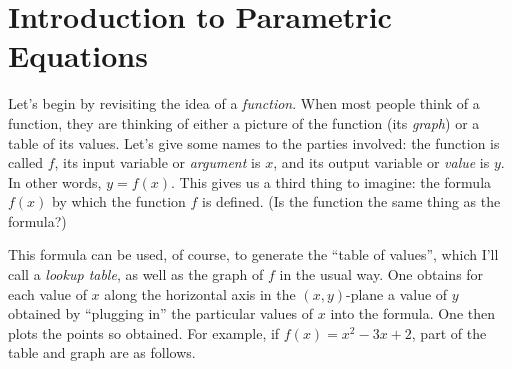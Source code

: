 \documentclass[11pt]{amsart}
\begin{document}
\section{Introduction to Parametric Equations}

Let's begin by revisiting the idea of a \emph{function}. When most people think of a function, they are thinking of either a picture of the function (its \emph{graph}) or a table of its values. Let's give some names to the parties involved: the function is called $f$, its input variable or \emph{argument} is $x$, and its output variable or \emph{value} is $y$. In other words, $y = f(x)$. This gives us a third thing to imagine: the formula $f(x)$ by which the function $f$ is defined. (Is the function the same thing as the formula?)

This formula can be used, of course, to generate the ``table of values'', which I'll call a \emph{lookup table}, as well as the graph of $f$ in the usual way. One obtains for each value of $x$ along the horizontal axis in the $(x,y)$-plane a value of $y$ obtained by ``plugging in'' the particular values of $x$ into the formula. One then plots the points so obtained. For example, if $f(x) = x^2 - 3x + 2$, part of the table and graph are as follows.
\end{document}
